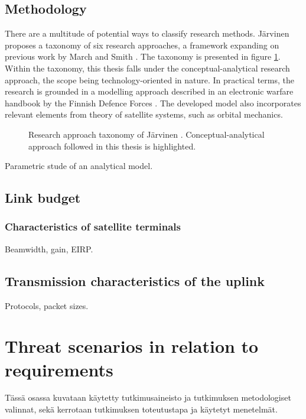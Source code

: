\documentclass[english, 12pt, a4paper, elec, utf8, a-1b, online]{aaltothesis}
\begin{document}
\subsection{Methodology}

There are a multitude of potential ways to classify research methods. Järvinen \cite{jarvinen2011tutkimustyon, jarvinen2004research} proposes a taxonomy of six research approaches, a framework expanding on previous work by March and Smith \cite{march}.
The taxonomy is presented in figure \ref{fig-research-taxonomy}.
Within the taxonomy, this thesis falls under the conceptual-analytical research approach, the scope being technology-oriented in nature.
In practical terms, the research is grounded in a modelling approach described in an electronic warfare handbook by the Finnish Defence Forces \cite{kosola2004elektroninen}.
The developed model also incorporates relevant elements from theory of satellite systems, such as orbital mechanics.



\begin{figure}[h]
  \centering
  
  \caption{Research approach taxonomy of Järvinen \cite{jarvinen2011tutkimustyon, jarvinen2004research}. Conceptual-analytical approach followed in this thesis is highlighted.}
  \label{fig-research-taxonomy}
\end{figure}

Parametric stude of an analytical model.

\subsection{Link budget}
\subsubsection{Characteristics of satellite terminals}
Beamwidth, gain, EIRP.

\subsection{Transmission characteristics of the uplink}
Protocols, packet sizes.

\section{Threat scenarios in relation to requirements}
T\"ass\"a osassa kuvataan k\"aytetty tutkimusaineisto ja
tutkimuksen metodologiset valinnat, sek\"a
kerrotaan tutkimuksen toteutustapa ja k\"aytetyt menetelm\"at.
\end{document}
